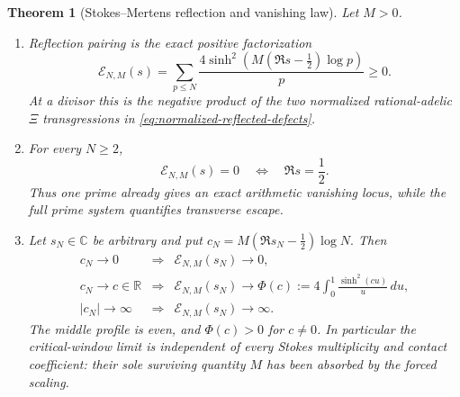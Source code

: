 \documentclass[11pt,a4paper]{amsart}
\theoremstyle{plain}
\newtheorem{theorem}{Theorem}[section]
\theoremstyle{definition}
\newcommand{\RR}{\mathbb R}
\newcommand{\CC}{\mathbb C}
\begin{document}
\begin{theorem}[Stokes--Mertens reflection and vanishing law]
\label{thm:stokes-mertens}
Let $M>0$.
\begin{enumerate}[label=\textup{(\roman*)}]
\item Reflection pairing is the exact positive factorization
\begin{equation}\label{eq:stokes-energy-hyperbolic}
 \boxed{\quad
 \mathcal E_{N,M}(s)
   =\sum_{p\leq N}
      \frac{4\sinh^2(M(\Re s-\tfrac12)\log p)}p\geq0.
 \quad}
\end{equation}
At a divisor this is the negative product of the two normalized rational-adelic $\Xi$
transgressions in \eqref{eq:normalized-reflected-defects}.
\item For every $N\geq2$,
\begin{equation}\label{eq:finite-stokes-vanishing}
             \mathcal E_{N,M}(s)=0
             \quad\Longleftrightarrow\quad \Re s=\frac12.
\end{equation}
Thus one prime already gives an exact arithmetic vanishing locus, while the full prime system
quantifies transverse escape.
\item Let $s_N\in\CC$ be arbitrary and put
\(
 c_N=M(\Re s_N-\tfrac12)\log N.
\)
Then
\begin{equation}\label{eq:stokes-mertens-trichotomy}
 \begin{array}{rcl}
 c_N\longrightarrow0
   &\Longrightarrow&\mathcal E_{N,M}(s_N)\longrightarrow0,\\[2mm]
 c_N\longrightarrow c\in\RR
   &\Longrightarrow&\displaystyle
      \mathcal E_{N,M}(s_N)\longrightarrow
      \Phi(c):=4\int_0^1\frac{\sinh^2(cu)}u\,du,\\[3mm]
 |c_N|\longrightarrow\infty
   &\Longrightarrow&\mathcal E_{N,M}(s_N)\longrightarrow\infty.
 \end{array}
\end{equation}
The middle profile is even, and $\Phi(c)>0$ for $c\ne0$.  In particular the critical-window
limit is independent of every Stokes multiplicity and contact coefficient: their sole surviving
quantity $M$ has been absorbed by the forced scaling.
\end{enumerate}
\end{theorem}
\end{document}

